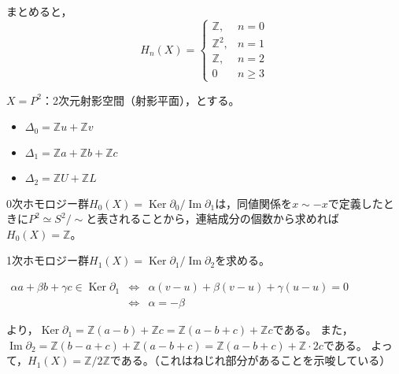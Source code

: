 \documentclass[uplatex]{jsarticle}
\DeclareMathOperator{\Image}{Im}
\DeclareMathOperator{\Kernel}{Ker}
\begin{document}
\begin{rei}[トーラスのホモロジー群]
	まとめると，
	\begin{equation}
		H_{n}(X) = \begin{cases}
			\mathbb{Z}, & n=0 \\
			\mathbb{Z}^{2}, & n=1 \\
			\mathbb{Z}, & n=2 \\
			0 & n \ge 3
		\end{cases}
	\end{equation}
\end{rei}

\begin{rei}[射影平面のホモロジー群]
	$X = P^{2}$：2次元射影空間（射影平面），とする。
	\begin{center}
	\end{center}
	\begin{itemize}
		\vspace{-0.5\baselineskip}
		\item $\Delta_{0} = \mathbb{Z} u + \mathbb{Z} v$
		\item $\Delta_{1} = \mathbb{Z} a + \mathbb{Z} b + \mathbb{Z} c$
		\item $\Delta_{2} = \mathbb{Z} U + \mathbb{Z} L$
	\end{itemize}

	0次ホモロジー群$H_{0}(X) = \Kernel \partial_{0} / \Image \partial_{1}$は，同値関係を$x \sim -x$で定義したときに$P^{2} \simeq S^{2} / \sim$と表されることから，連結成分の個数から求めれば$H_{0}(X) = \mathbb{Z}$。

	1次ホモロジー群$H_{1}(X) = \Kernel \partial_{1} / \Image \partial_{2}$を求める。
	\renewcommand{\arraystretch}{1}
	\begin{center}
		$\begin{array}{lcl}
			\alpha a + \beta b + \gamma c \in \Kernel \partial_{1} & \Longleftrightarrow & \alpha (v-u) + \beta (v-u) + \gamma (u-u) = 0 \\
			& \Longleftrightarrow & \alpha = - \beta
		\end{array}$
	\end{center}
	より，$\Kernel \partial_{1} = \mathbb{Z} (a-b) + \mathbb{Z} c = \mathbb{Z} (a-b+c) + \mathbb{Z} c$である。
	また，$\Image \partial_{2} = \mathbb{Z} (b-a+c) + \mathbb{Z} (a-b+c) = \mathbb{Z} (a-b+c) + \mathbb{Z} \cdot 2c$である。
	よって，$H_{1}(X) = \mathbb{Z} / 2 \mathbb{Z}$である。（これはねじれ部分があることを示唆している）


\end{rei}
\end{document}
